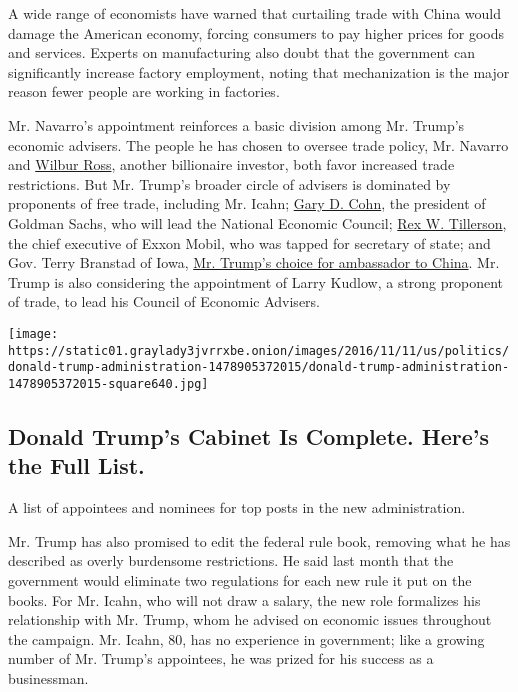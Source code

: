 A wide range of economists have warned that curtailing trade with China
would damage the American economy, forcing consumers to pay higher
prices for goods and services. Experts on manufacturing also doubt that
the government can significantly increase factory employment, noting
that mechanization is the major reason fewer people are working in
factories.

Mr. Navarro's appointment reinforces a basic division among Mr. Trump's
economic advisers. The people he has chosen to oversee trade policy, Mr.
Navarro and
\href{https://www.nytimes3xbfgragh.onion/2016/11/24/us/politics/wilbur-ross-commerce-trump.html}{Wilbur
Ross}, another billionaire investor, both favor increased trade
restrictions. But Mr. Trump's broader circle of advisers is dominated by
proponents of free trade, including Mr. Icahn;
\href{https://www.nytimes3xbfgragh.onion/2016/12/12/business/dealbook/goldman-sachs-gary-cohn.html}{Gary
D. Cohn}, the president of Goldman Sachs, who will lead the National
Economic Council;
\href{https://www.nytimes3xbfgragh.onion/2016/12/12/us/politics/rex-tillerson-secretary-of-state-trump.html}{Rex
W. Tillerson}, the chief executive of Exxon Mobil, who was tapped for
secretary of state; and Gov. Terry Branstad of Iowa,
\href{http://www.nytimes3xbfgragh.onion/2016/12/07/us/politics/terry-branstad-china-ambassador-trump.html?_r=0}{Mr.
Trump's choice for ambassador to China}. Mr. Trump is also considering
the appointment of Larry Kudlow, a strong proponent of trade, to lead
his Council of Economic Advisers.

\href{https://www.nytimes3xbfgragh.onion/interactive/2016/us/politics/donald-trump-administration.html}{}

\texttt{[image: https://static01.graylady3jvrrxbe.onion/images/2016/11/11/us/politics/donald-trump-administration-1478905372015/donald-trump-administration-1478905372015-square640.jpg]}

\hypertarget{donald-trumps-cabinet-is-complete-heres-the-full-list}{%
\subsection{Donald Trump's Cabinet Is Complete. Here's the Full
List.}\label{donald-trumps-cabinet-is-complete-heres-the-full-list}}

A list of appointees and nominees for top posts in the new
administration.

Mr. Trump has also promised to edit the federal rule book, removing what
he has described as overly burdensome restrictions. He said last month
that the government would eliminate two regulations for each new rule it
put on the books. For Mr. Icahn, who will not draw a salary, the new
role formalizes his relationship with Mr. Trump, whom he advised on
economic issues throughout the campaign. Mr. Icahn, 80, has no
experience in government; like a growing number of Mr. Trump's
appointees, he was prized for his success as a businessman.

